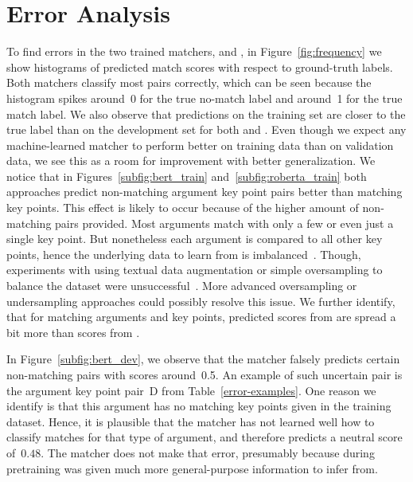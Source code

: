 \section{Error Analysis}\label{error-analysis}




To find errors in the two trained matchers, \BertBase and \RobertaBase, in Figure~\ref{fig:frequency} we show 
histograms of predicted match scores with respect to ground-truth labels.
Both matchers classify most pairs correctly, which can be seen because the histogram spikes around~0 for the 
true no-match label and around~1 for the true match label.
We also observe that predictions on the training set are closer to the true label than on the development set 
for both \RobertaBase and \BertBase.
Even though we expect any machine-learned matcher to perform better on training data than on validation data, 
we see this as a room for improvement with better generalization.
We notice that in Figures~\ref{subfig:bert_train} and~\ref{subfig:roberta_train} both approaches predict non-matching 
argument key point pairs better than matching key points.
This effect is likely to occur because of the higher amount of non-matching pairs provided.
Most arguments match with only a few or even just a single key point.
But nonetheless each argument is compared to all other key points, hence the underlying data to learn from is 
imbalanced~\cite{BarandelaVSF2004}.
Though, experiments with using textual data augmentation or simple oversampling to balance the dataset were 
unsuccessful~\cite{Dietterich1995}.
More advanced oversampling or undersampling approaches could possibly resolve this issue.
We further identify, that for matching arguments and key points, predicted scores from \BertBase are spread a 
bit more than scores from \RobertaBase.

In Figure~\ref{subfig:bert_dev}, we observe that the \BertBase matcher falsely predicts certain non-matching pairs with scores around~0.5.
An example of such uncertain pair is the argument key point pair~D from Table~\ref{error-examples}.
One reason we identify is that this argument has no matching key points given in the training dataset.
Hence, it is plausible that the \BertBase matcher has not learned well how to classify matches for that type of 
argument, and therefore predicts a neutral score of~\(0.48\).
The \RobertaBase matcher does not make that error, presumably because during pretraining \Roberta was given much 
more general-purpose information to infer from.

